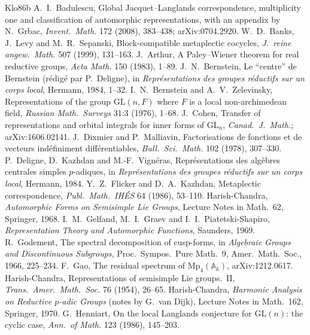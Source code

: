 \documentclass[12pt]{article}
\newcommand{\A}{\mathbb{A}}
\newcommand{\GL}{\mathrm{GL}}
\theoremstyle{plain}
\theoremstyle{definition}
\begin{document}
\begin{thebibliography}{Klo86b}\small
{} A.~I.~Badulescu, Global Jacquet--Langlands correspondence, multiplicity one and classification of automorphic representations, with an appendix by N.~Grbac, \emph{Invent.\ Math.} 172 (2008), 383--438; arXiv:0704.2920.
 W.~D.~Banks, J.~Levy and M.~R.~Sepanski, Block-compatible metaplectic cocycles, \emph{J.\ reine angew.\ Math.} 507 (1999), 131--163.
 J.~Arthur, A Paley--Wiener theorem for real reductive groups, \emph{Acta Math.} 150 (1983), 1--89.
 J.~N.~Bernstein, Le ``centre'' de Bernstein (r\'edig\'e par P.~Deligne), in \emph{Repr\'esentations des groupes r\'eductifs sur un corps local}, Hermann, 1984, 1--32.
 I.~N.~Bernstein and A.~V.~Zelevinsky, Representations of the group $\GL(n,F)$ where $F$ is a local non-archimedean field, \emph{Russian Math.\ Surveys} 31:3 (1976), 1--68.
 J.~Cohen, Transfer of representations and orbital integrals for inner forms of $\GL_n$, \emph{Canad.\ J.\ Math.}; arXiv:1606.02141.
 J.~Dixmier and P.~Malliavin, Factorisations de fonctions et de vecteurs ind\'efiniment diff\'erentiables, \emph{Bull.\ Sci.\ Math.} 102 (1978), 307--330.
 P.~Deligne, D.~Kazhdan and M.-F.~Vign\'eras, Repr\'esentations des alg\`ebres centrales simples $p$-adiques, in \emph{Repr\'esentations des groupes r\'eductifs sur un corps local}, Hermann, 1984.
 Y.~Z.~Flicker and D.~A.~Kazhdan, Metaplectic correspondence, \emph{Publ.\ Math.\ IH\'ES} 64 (1986), 53--110.
 Harish-Chandra, \emph{Automorphic Forms on Semisimple Lie Groups}, Lecture Notes in Math.\ 62, Springer, 1968.
 I.~M.~Gelfand, M.~I.~Graev and I.~I.~Piatetski-Shapiro, \emph{Representation Theory and Automorphic Functions}, Saunders, 1969.
 R.~Godement, The spectral decomposition of cusp-forms, in \emph{Algebraic Groups and Discontinuous Subgroups}, Proc.\ Sympos.\ Pure Math.\ 9, Amer.\ Math.\ Soc., 1966, 225--234.
 F.~Gao, The residual spectrum of $\mathrm{Mp}_4(\A_k)$, arXiv:1212.0617.
 Harish-Chandra, Representations of semisimple Lie groups.\ II, \emph{Trans.\ Amer.\ Math.\ Soc.} 76 (1954), 26--65.
 Harish-Chandra, \emph{Harmonic Analysis on Reductive $p$-adic Groups} (notes by G.~van Dijk), Lecture Notes in Math.\ 162, Springer, 1970.
 G.~Henniart, On the local Langlands conjecture for $\GL(n)$: the cyclic case, \emph{Ann.\ of Math.} 123 (1986), 145--203.

\end{thebibliography}
\end{document}
